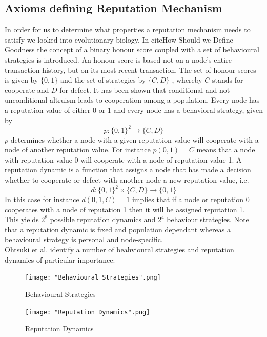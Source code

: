 \documentclass[11pt,a4paper]{report}
\theoremstyle{definition}
\theoremstyle{theorem}
\theoremstyle{proposition}
\theoremstyle{corollary}
\theoremstyle{lemma}
\theoremstyle{example}
\theoremstyle{remark}
\begin{document}
\subsection{Axioms defining Reputation Mechanism}
\label{subsec:Axioms defining Reputation Mechanism}
In order for us to determine what properties a reputation mechanism needs to satisfy we looked into evolutionary biology. In cite{How Should we Define Goodness} the concept of a binary honour score coupled with a set of behavioural strategies is introduced. An honour score is based not on a node's entire transaction history, but on its most recent transaction. The set of honour scores is given by $\{0,1\}$ and the set of strategies by $\{C,D\}$ , whereby $C$ stands for cooperate and $D$ for defect. It has been shown that conditional and not unconditional altruism leads to cooperation among a population. Every node has a reputation value of either 0 or 1 and every node has a behavioral strategy, given by 
\[
p:\{0,1\}^2\rightarrow{}\{C,D\}
\]
$p$ determines whether a node with a given reputation value will cooperate with a node of another reputation value. For instance $p(0,1)=C$ means that a node with reputation value 0 will cooperate with a node of reputation value 1. A reputation dynamic is a function that assigns a node that has made a decision whether to cooperate or defect with another node a new reputation value, i.e.
\[
d:\{0,1\}^2\times{}\{C,D\}\rightarrow{}\{0,1\}
\]
In this case for instance $d(0,1,C)=1$ implies that if a node or reputation 0 cooperates with a node of reputation 1 then it will be assigned reputation 1. \vspace{1em}\\
This yields $2^8$ possible reputation dynamics and $2^4$ behaviour strategies. Note that a reputation dynamic is fixed and population dependant whereas a behavioural strategy is personal and node-specific. \vspace{1em}\\

\noindent{}Ohtsuki et al. identify a number of beahvioural strategies and reputation dynamics of particular importance:

{\centering
\begin{figure}[H]
\begin{center}
\texttt{[image: "Behavioural Strategies".png]}
\end{center}
\label{fig:BehvaiouralStrategies}
\caption{Behavioural Strategies}
\end{figure}
}

{\centering
\begin{figure}[H]
\texttt{[image: "Reputation Dynamics".png]}
\label{fig:ReputationDynamics}
\caption{Reputation Dynamics}
\end{figure}
}
\end{document}
